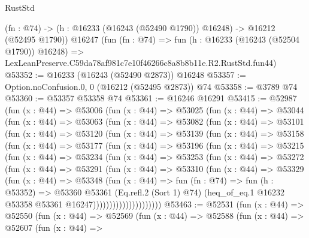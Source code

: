 \begin{lexlean}{RustStd}
\begin{coremodule}
    (fn : @74) -> (h : @16233 (@16243 (@52490 @1790)) @16248) -> @16212 (@52495 @1790))
    @16247
    (fun (fn : @74) =>
    fun (h : @16233 (@16243 (@52504 @1790)) @16248) =>
    LexLeanPreserve.C59da78af981c7e10f46266c8a8b8b11e.R2.RustStd.fun44)
@53352 := @16233 (@16243 (@52490 @2873)) @16248
@53357 := Option.noConfusion.{0, 0} (@16212 (@52495 @2873)) @74
@53358 := @3789 @74
@53360 := @53357 @53358 @74
@53361 := @16246 @16291
@53415 := @52987
    (fun (x : @44) =>
    @53006
      (fun (x : @44) =>
      @53025
        (fun (x : @44) =>
        @53044
          (fun (x : @44) =>
          @53063
            (fun (x : @44) =>
            @53082
              (fun (x : @44) =>
              @53101
                (fun (x : @44) =>
                @53120
                  (fun (x : @44) =>
                  @53139
                    (fun (x : @44) =>
                    @53158
                      (fun (x : @44) =>
                      @53177
                        (fun (x : @44) =>
                        @53196
                          (fun (x : @44) =>
                          @53215
                            (fun (x : @44) =>
                            @53234
                              (fun (x : @44) =>
                              @53253
                                (fun (x : @44) =>
                                @53272
                                  (fun (x : @44) =>
                                  @53291
                                    (fun (x : @44) =>
                                    @53310
                                      (fun (x : @44) =>
                                      @53329
                                        (fun (x : @44) =>
                                        @53348
                                          (fun (x : @44) =>
                                          fun (fn : @74) =>
                                          fun (h : @53352) =>
                                          @53360
                                            @53361
                                            (Eq.refl.{2} (Sort 1) @74)
                                            (heq_of_eq.{1}
                                              @16232
                                              @53358
                                              @53361
                                              @16247)))))))))))))))))))))
@53463 := @52531
    (fun (x : @44) =>
    @52550
      (fun (x : @44) =>
      @52569
        (fun (x : @44) =>
        @52588
          (fun (x : @44) =>
          @52607
            (fun (x : @44) =>

\end{coremodule}
\end{lexlean}
